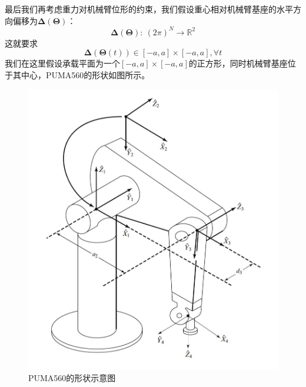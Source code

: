 \documentclass[conference]{IEEEtran}
\begin{document}
最后我们再考虑重力对机械臂位形的约束，我们假设重心相对机械臂基座的水平方向偏移为$\boldsymbol{\Delta}(\boldsymbol{\Theta})$：
\begin{equation}
    \boldsymbol{\Delta}(\boldsymbol{\Theta}):\ (2\pi)^N\rightarrow \mathbb{R}^2
\end{equation}
这就要求
\begin{equation}
    \boldsymbol{\Delta}(\boldsymbol{\Theta}(t))\in [-a, a]\times[-a, a], \forall t
\end{equation}
我们在这里假设承载平面为一个$[-a, a]\times[-a, a]$的正方形，同时机械臂基座位于其中心，PUMA560的形状如图所示。
\begin{figure}[htbp]
    \includegraphics[width=\linewidth]{structure.png}
    \caption{PUMA560的形状示意图}
\end{figure}
\end{document}

